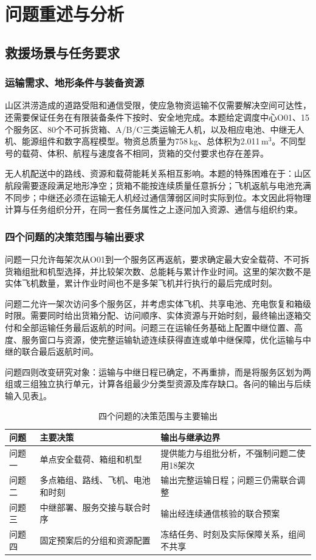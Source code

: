 \documentclass[withoutpreface,colorprint]{format}
\numberwithin{equation}{section}
\numberwithin{figure}{section}
\numberwithin{table}{section}
\begin{document}
\section{问题重述与分析}
\label{sec:problem_analysis}

\subsection{救援场景与任务要求}
\subsubsection{运输需求、地形条件与装备资源}
山区洪涝造成的道路受阻和通信受限，使应急物资运输不仅需要解决空间可达性，还需要保证任务在有限装备条件下按时、安全地完成。本题给定调度中心O01、15个服务区、80个不可拆货箱、A/B/C三类运输无人机，以及相应电池、中继无人机、能源组件和数字高程模型。物资总质量为758\,kg、总体积为2.011\,m$^3$。不同型号的载荷、体积、航程与速度各不相同，货箱的交付要求也存在差异。

无人机配送中的路线、资源和载荷能耗关系相互影响\cite{dorling2017,murray2015fstsp}。本题的特殊困难在于：山区航段需要逐段满足地形净空；货箱不能按连续质量任意拆分；飞机返航与电池充满不同步；中继还必须在运输无人机经过通信薄弱区间时实际到位。本文因此将物理计算与任务组织分开，在同一套任务属性之上逐问加入资源、通信与组织约束。

\subsubsection{四个问题的决策范围与输出要求}
问题一只允许每架次从O01到一个服务区再返航，要求确定最大安全载荷、不可拆货箱组批和机型选择，并比较架次数、总能耗与累计作业时间。这里的架次数不是实体飞机数量，累计作业时间也不是多架飞机并行执行的最后完成时刻。

问题二允许一架次访问多个服务区，并考虑实体飞机、共享电池、充电恢复和箱级时限。需要同时给出货箱分配、访问顺序、实体资源与开始时刻，最终输出逐箱交付和全部运输任务最后返航的时间。问题三在运输任务基础上配置中继位置、高度、服务窗口与资源，使完整运输轨迹连续获得直连或单中继保障，优化运输与中继的联合最后返航时间。

问题四则改变研究对象：运输与中继日程已确定，不再重排，而是将服务区划为两组或三组独立执行单元，计算各组最少分类型资源及库存缺口。各问的输出与后续输入见表\ref{tab:problem_scope}。
\begin{table}[htbp]
\centering\small
\caption{四个问题的决策范围与主要输出}\label{tab:problem_scope}
\begin{tabularx}{\linewidth}{lXX}
\toprule
问题 & 主要决策 & 输出与继承边界\\
\midrule
问题一 & 单点安全载荷、箱组和机型 & 提供能力与组批分析，不强制问题二使用18架次\\
问题二 & 多点箱组、路线、飞机、电池和时刻 & 输出完整运输日程；问题三仍需联合调整\\
问题三 & 中继部署、服务交接与联合时序 & 输出经连续通信核验的联合预案\\
问题四 & 固定预案后的分组和资源配置 & 冻结任务、时刻及实际保障关系，组间不共享\\
\bottomrule
\end{tabularx}
\end{table}
\end{document}
